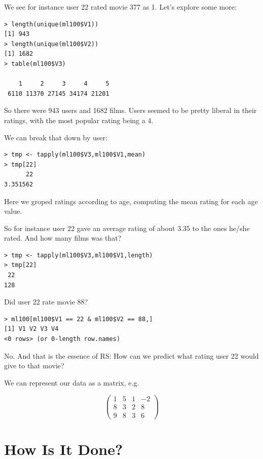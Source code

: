 We see for instance user 22 rated movie 377 as 1.  Let's explore some more:

\begin{lstlisting}
> length(unique(ml100$V1))
[1] 943
> length(unique(ml100$V2))
[1] 1682
> table(ml100$V3)

    1     2     3     4     5 
 6110 11370 27145 34174 21201 
\end{lstlisting}

So there were 943 users and 1682 films.  Users seemed to be pretty
liberal in their ratings, with the most popular rating being a 4.

We can break that down by user:

\begin{lstlisting}
> tmp <- tapply(ml100$V3,ml100$V1,mean)
> tmp[22]
      22 
3.351562 
\end{lstlisting}

Here we groped ratings according to age, computing the mean rating for
each age value.

So for instance user 22 gave an average rating of about 3.35 to the ones
he/she rated.  And how many films was that?

\begin{lstlisting}
> tmp <- tapply(ml100$V3,ml100$V1,length)
> tmp[22]
 22 
128 
\end{lstlisting}

Did user 22 rate movie 88?

\begin{lstlisting}
> ml100[ml100$V1 == 22 & ml100$V2 == 88,]
[1] V1 V2 V3 V4
<0 rows> (or 0-length row.names)
\end{lstlisting}

No.  And that is the essence of RS:  How can we predict what rating user
22 would give to that movie?

We can represent our data as a matrix, e.g.

\begin{equation}
\label{ratmat}
\left (
\begin{array}{rrrr}
1 & 5 & 1 & -2 \\
8 & 3 & 2 & 8 \\
9 & 8 & 3 & 6 
\end{array}
\right )
\end{equation}


\section{How Is It Done?}


